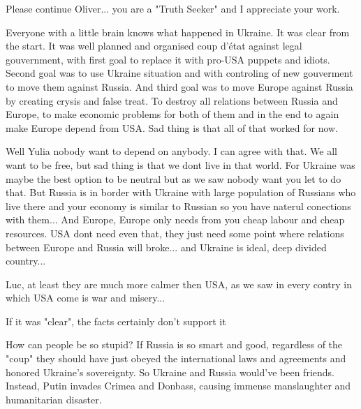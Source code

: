 \begin{itemize}

Please continue Oliver... you are a "Truth Seeker" and I appreciate your work.


Everyone with a little brain knows what happened in Ukraine. It was clear from
the start. It was well planned and organised coup d'état against legal
gouvernment, with first goal to replace it with pro-USA puppets and idiots.
Second goal was to use Ukraine situation and with controling of new gouverment
to move them against Russia. And third goal was to move Europe against Russia
by creating crysis and false treat. To destroy all relations between Russia and
Europe, to make economic problems for both of them and in the end to again make
Europe depend from USA. Sad thing is that all of that worked for now.

\begin{itemize} %

Well Yulia nobody want to depend on anybody. I can agree with that. We all want
to be free, but sad thing is that we dont live in that world. For Ukraine was
maybe the best option to be neutral but as we saw nobody want you let to do
that. But Russia is in border with Ukraine with large population of Russians
who live there and your economy is similar to Russian so you have naterul
conections with them... And Europe, Europe only needs from you cheap labour and
cheap resources. USA dont need even that, they just need some point where
relations between Europe and Russia will broke... and Ukraine is ideal, deep
divided country...

Luc, at least they are much more calmer then USA, as we saw in every contry in which USA come is war and misery...

If it was "clear", the facts certainly don't support it


How can people be so stupid? If Russia is so smart and good, regardless of the
"coup" they should have just obeyed the international laws and agreements and
honored Ukraine's sovereignty. So Ukraine and Russia would've been friends.
Instead, Putin invades Crimea and Donbass, causing immense manslaughter and
humanitarian disaster.



\end{itemize}
\end{itemize}
